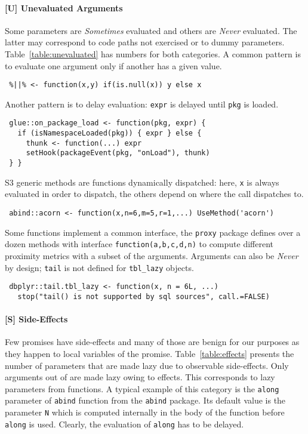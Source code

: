 \documentclass[review,creen,acmsmall]{acmart}
\newcommand{\sometimes}{\emph{Sometimes}\xspace}
\newcommand{\never}{\emph{Never}\xspace}
\newcommand{\code}[1]{\lstinline |#1|\xspace}
\renewcommand{\c}[1]{\lstinline |#1|\xspace}
\begin{document}
\paragraph{{\normalfont \textbf{[U]}} Unevaluated Arguments}
Some parameters are \sometimes evaluated and others are \never evaluated. The
latter may correspond to code paths not exercised or to dummy parameters.
Table~\ref{table:unevaluated} has numbers for both categories. A common pattern
is to evaluate one argument only if another has a given value.

\begin{lstlisting}
 %||% <- function(x,y) if(is.null(x)) y else x
\end{lstlisting}

Another pattern is to delay evaluation: \c{expr} is delayed until \c{pkg} is
loaded.

\begin{lstlisting}
 glue::on_package_load <- function(pkg, expr) {
   if (isNamespaceLoaded(pkg)) { expr } else {
     thunk <- function(...) expr
     setHook(packageEvent(pkg, "onLoad"), thunk)
 } }
\end{lstlisting}

S3 generic methods are functions dynamically dispatched: here, \c x is always
evaluated in order to dispatch, the others depend on where the call dispatches
to.

\begin{lstlisting}
 abind::acorn <- function(x,n=6,m=5,r=1,...) UseMethod('acorn')
\end{lstlisting}

Some functions implement a common interface, the \c{proxy} package defines over
a dozen methods with interface \c{function(a,b,c,d,n)} to compute different
proximity metrics with a subset of the arguments. Arguments can also be \never
by design; \c{tail} is not defined for \c{tbl_lazy} objects.

\begin{lstlisting}
 dbplyr::tail.tbl_lazy <- function(x, n = 6L, ...)
   stop("tail() is not supported by sql sources", call.=FALSE)
\end{lstlisting}


\paragraph{{\normalfont \textbf{[S]}} Side-Effects}
Few promises have side-effects and many of those are benign for our purposes as
they happen to local variables of the promise. Table~\ref{table:effects}
presents the number of parameters that are made lazy due to observable
side-effects. Only \EffectCountArgumentsTotal arguments out of
\TotalArgumentCount are made lazy owing to effects. This corresponds to
\EffectCountParametersTotal lazy parameters from \EffectCountFunctionsTotal
functions. A typical example of this category is the \code{along} parameter of
\code{abind} function from the \code{abind} package. Its default value is the
parameter \code{N} which is computed internally in the body of the function
before \code{along} is used. Clearly, the evaluation of \code{along} has to be
delayed.
\end{document}
